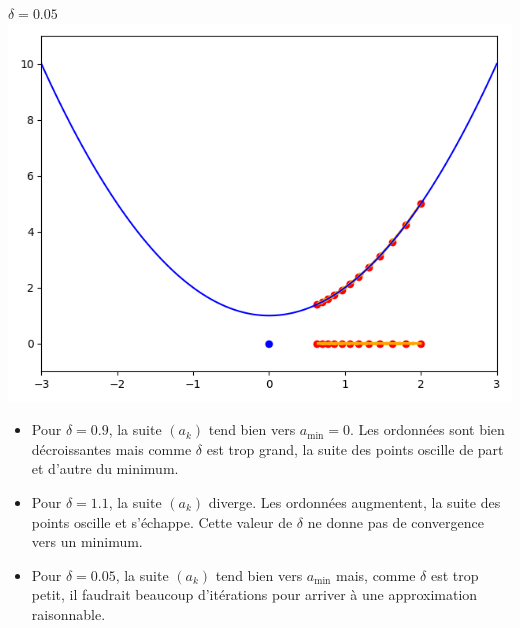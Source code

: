 \begin{exemple}{}{}
\begin{center}
\begin{minipage}{0.32\textwidth}
\begin{center}
			\end{center}
		\end{minipage}
		\begin{minipage}{0.32\textwidth}
			\begin{center}
				$\delta=0.05$
				\includegraphics[scale=\myscale,scale=0.3]{figures/descente_une_var_05}
			\end{center}
		\end{minipage}
	\end{center}
	
	\begin{itemize}
		\item Pour $\delta = 0.9$, la suite $(a_k)$ tend bien vers $a_{\min} = 0$. Les ordonnées sont bien décroissantes mais comme $\delta$ est trop grand, la suite des points oscille de part et d'autre du minimum.
		
		\item Pour $\delta = 1.1$, la suite $(a_k)$ diverge. Les ordonnées augmentent, la suite des points oscille et s'échappe. Cette valeur de $\delta$ ne donne pas de convergence vers un minimum.
		
		\item Pour $\delta = 0.05$, la suite $(a_k)$ tend bien vers $a_{\min}$ mais, comme $\delta$ est trop petit, il faudrait beaucoup d'itérations pour arriver à une approximation raisonnable.
		
	\end{itemize}
\end{exemple}

